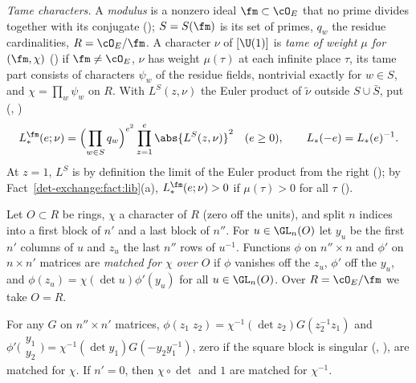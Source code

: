 \emph{Tame characters.} A \emph{modulus} is a nonzero ideal $\fm\subset\cO_E$ that no prime divides
together with its conjugate (); $S=S(\fm)$ is its set of primes, $q_w$ the residue
cardinalities, $R=\cO_E/\fm$. A character $\nu$ of $[\U(1)]$ is \emph{tame of weight $\mu$ for
$(\fm,\chi)$} () if $\fm\ne\cO_E$, $\nu$ has weight $\mu(\tau)$ at each
infinite place $\tau$, its tame part consists of characters $\psi_w$ of the residue fields,
nontrivial exactly for $w\in S$, and $\chi=\prod_w\psi_w$ on $R$. With $L^S(z,\nu)$ the Euler
product of $\tilde\nu$ outside $S\cup\bar S$, put (,
)
\begin{equation}\label{det-exchange:eq:Lstar}
  L_*^{\fm}(e;\nu)=\Bigl(\prod_{w\in S}q_w\Bigr)^{e^2}\prod_{z=1}^{e}\abs{L^{S}(z,\nu)}^2
  \quad(e\ge0),\qquad L_*(-e)=L_*(e)^{-1}.
\end{equation}
At $z=1$, $L^S$ is by definition the limit of the Euler product from the right
(); by Fact~\ref{det-exchange:fact:lib}(a), $L_*^{\fm}(e;\nu)>0$ if
$\mu(\tau)>0$ for all $\tau$ ().

\begin{definition}\label{det-exchange:def:matched}
Let $O\subset R$ be rings, $\chi$ a character of $R$ (zero off the units), and split $n$ indices
into a first block of $n'$ and a last block of $n''$. For $u\in\GL_n(O)$ let $y_u$ be the first $n'$
columns of $u$ and $z_u$ the last $n''$ rows of $u^{-1}$. Functions $\phi$ on $n''\times n$ and
$\phi'$ on $n\times n'$ matrices are \emph{matched for $\chi$ over $O$} if $\phi$ vanishes off the
$z_u$, $\phi'$ off the $y_u$, and $\phi(z_u)=\chi(\det u)\phi'(y_u)$ for all $u\in\GL_n(O)$. Over
$R=\cO_E/\fm$ we take $O=R$.
\end{definition}

\begin{lemma}
\label{det-exchange:lem:block}
For any $G$ on $n''\times n'$ matrices, $\phi(z_1\;z_2)=\chi^{-1}(\det z_2)G(z_2^{-1}z_1)$ and
$\phi'\bigl(\begin{smallmatrix}y_1\\y_2\end{smallmatrix}\bigr)=\chi^{-1}(\det y_1)G(-y_2y_1^{-1})$,
zero if the square block is singular (,
), are matched for $\chi$. If $n'=0$, then $\chi\circ\det$ and $1$ are
matched for $\chi^{-1}$.
\end{lemma}

